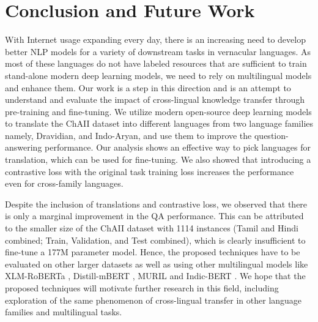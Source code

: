 \documentclass[11pt]{article}
\begin{document}
\section{Conclusion and Future Work}
With Internet usage expanding every day, there is an increasing need to develop better NLP models for a variety of downstream tasks in vernacular languages. As most of these languages do not have labeled resources that are sufficient to train stand-alone modern deep learning models, we need to rely on multilingual models and enhance them. Our work is a step in this direction and is an attempt to understand and evaluate the impact of cross-lingual knowledge transfer through pre-training and fine-tuning. We utilize modern open-source deep learning models to translate the ChAII dataset into different languages from two language families namely, Dravidian, and Indo-Aryan, and use them to improve the question-answering performance. Our analysis shows an effective way to pick languages for translation, which can be used for fine-tuning. We also showed that introducing a contrastive loss with the original task training loss increases the performance even for cross-family languages.

Despite the inclusion of translations and contrastive loss, we observed that there is only a marginal improvement in the QA performance. This can be attributed to the smaller size of the ChAII dataset with 1114 instances (Tamil and Hindi combined; Train, Validation, and Test combined), which is clearly insufficient to fine-tune a 177M parameter model. Hence, the proposed techniques have to be evaluated on other larger datasets as well as using other multilingual models like XLM-RoBERTa \cite{conneau2020unsupervised}, Distill-mBERT \cite{sanh2019distilbert}, MURIL \cite{khanuja2021muril} and Indic-BERT \cite{kakwani2020indicnlpsuite}. We hope that the proposed techniques will motivate further research in this field, including exploration of the same phenomenon of cross-lingual transfer in other language families and multilingual tasks.





\end{document}
